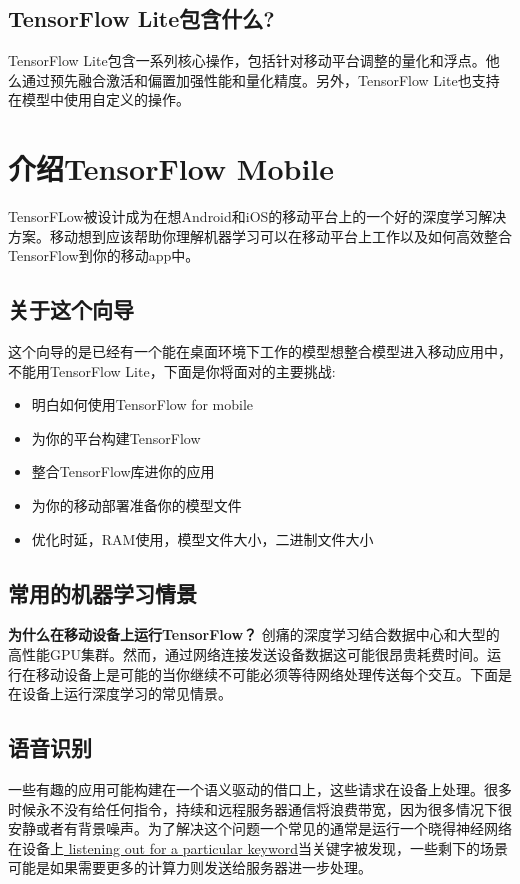 \subsection{TensorFlow Lite包含什么?}
TensorFlow Lite包含一系列核心操作，包括针对移动平台调整的量化和浮点。他么通过预先融合激活和偏置加强性能和量化精度。另外，TensorFlow Lite也支持在模型中使用自定义的操作。
\section{介绍TensorFlow Mobile}
TensorFLow被设计成为在想Android和iOS的移动平台上的一个好的深度学习解决方案。移动想到应该帮助你理解机器学习可以在移动平台上工作以及如何高效整合TensorFlow到你的移动app中。
\subsection{关于这个向导}
这个向导的是已经有一个能在桌面环境下工作的模型想整合模型进入移动应用中，不能用TensorFlow Lite，下面是你将面对的主要挑战:
\begin{itemize}
    \item 明白如何使用TensorFlow for mobile 
    \item 为你的平台构建TensorFlow
    \item 整合TensorFlow库进你的应用
    \item 为你的移动部署准备你的模型文件
    \item 优化时延，RAM使用，模型文件大小，二进制文件大小
\end{itemize}
\subsection{常用的机器学习情景}
\textbf{为什么在移动设备上运行TensorFlow？}\newline
创痛的深度学习结合数据中心和大型的高性能GPU集群。然而，通过网络连接发送设备数据这可能很昂贵耗费时间。运行在移动设备上是可能的当你继续不可能必须等待网络处理传送每个交互。下面是在设备上运行深度学习的常见情景。
\subsection{语音识别}
一些有趣的应用可能构建在一个语义驱动的借口上，这些请求在设备上处理。很多时候永不没有给任何指令，持续和远程服务器通信将浪费带宽，因为很多情况下很安静或者有背景噪声。为了解决这个问题一个常见的通常是运行一个晓得神经网络在设备上\href{https://www.tensorflow.org/tutorials/audio_recognition?hl=zh-cn}{ listening out for a particular keyword}当关键字被发现，一些剩下的场景可能是如果需要更多的计算力则发送给服务器进一步处理。
